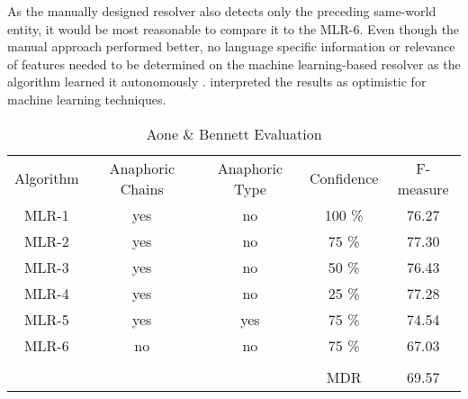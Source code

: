 As the manually designed resolver also detects only the preceding same-world entity, it would be most reasonable to compare it to the MLR-6. Even though the manual approach performed better, no language specific information or relevance of features needed to be determined on the machine learning-based resolver as the algorithm learned it autonomously \citep{aone1995evaluating}. \cite{aone1995evaluating} interpreted the results as optimistic for machine learning techniques.


\begin{table}[h]
  \caption{Aone \& Bennett Evaluation}
\begin{tabular}{|c|c|c|c|c|}
	\cline{1-5}
	Algorithm & Anaphoric Chains & Anaphoric Type& Confidence & F-measure \\ \cline{1-5}
	\cline{1-5}
	MLR-1 & yes & no & 100 \% &  76.27 \\ \cline{1-5}
	MLR-2 & yes & no & 75 \% & 77.30 \\ \cline{1-5}
	MLR-3 & yes & no & 50 \% & 76.43 \\ \cline{1-5}
	MLR-4 & yes & no & 25 \% & 77.28 \\ \cline{1-5}
	MLR-5 & yes & yes & 75 \% & 74.54 \\ \cline{1-5}
	MLR-6 & no & no & 75 \% & 67.03 \\ \cline{1-5}
	\multicolumn{5}{r}{}\\ \cline{4-5}
	\multicolumn{2}{r}{} & &  MDR & 69.57 \\
\cline{4-5}
	\end{tabular}

     \label{table:aone1995evals}
\end{table}


